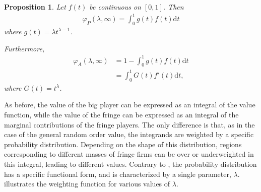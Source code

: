 \documentclass[a4paper]{article}
\newtheorem{proposition}{Proposition}
\newcommand{\dt}{\mathrm{d}t}
\begin{document}
\begin{proposition}
    \label{prop:one_sided_weighted}
    Let $f(t)$ be continuous on $[0, 1]$. Then
    \begin{align*}
        \varphi_P(\lambda, \infty) = \int_0^1 g(t) f(t) \dt
    \end{align*}
    where $g(t) = \lambda t^{\lambda - 1}$.

    Furthermore,
    \begin{align*}
        \varphi_A(\lambda, \infty) &= 1 - \int_0^1 g(t) f(t) \dt \\
                                &= \int_0^1 G(t) f'(t) \dt,
    \end{align*}
    where $G(t) = t^\lambda$.
\end{proposition}

As before, the value of the big player can be expressed as an integral of the value function, while the value of the fringe can be expressed as an integral of the marginal contributions of the fringe players.
The only difference is that, as in the case of the general random order value, the integrands are weighted by a specific probability distribution.
Depending on the shape of this distribution, regions corresponding to different masses of fringe firms can be over or underweighted in this integral, leading to different values.
Contrary to , the probability distribution has a specific functional form, and is characterized by a single parameter, $\lambda$.
 illustrates the weighting function for various values of $\lambda$.
\end{document}
